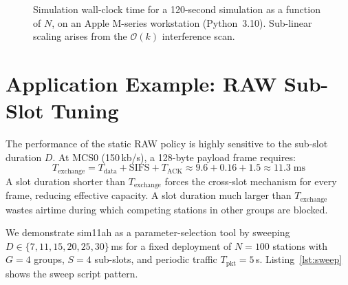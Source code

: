 \documentclass[conference]{IEEEtran}
\begin{document}
\begin{figure}[!t]
\centering
{}
\caption{Simulation wall-clock time for a 120-second simulation as a function
  of $N$, on an Apple M-series workstation (Python~3.10).
  Sub-linear scaling arises from the $\mathcal{O}(k)$ interference scan.}
\label{fig:speed}
\end{figure}

\section{Application Example: RAW Sub-Slot Tuning}
\label{sec:app_example}

The performance of the static RAW policy is highly sensitive to the
sub-slot duration $D$.
At MCS0 (150\,kb/s), a 128-byte payload frame requires:
\begin{equation}
  T_\mathrm{exchange} = T_\mathrm{data} + \mathrm{SIFS} + T_\mathrm{ACK}
  \approx 9.6 + 0.16 + 1.5 \approx 11.3\;\mathrm{ms}
\end{equation}
A slot duration shorter than $T_\mathrm{exchange}$ forces the cross-slot
mechanism for every frame, reducing effective capacity.
A slot duration much larger than $T_\mathrm{exchange}$ wastes airtime during
which competing stations in other groups are blocked.

We demonstrate sim11ah as a parameter-selection tool by sweeping
$D \in \{7, 11, 15, 20, 25, 30\}$\,ms for a fixed deployment of $N{=}100$
stations with $G{=}4$ groups, $S{=}4$ sub-slots, and periodic traffic
$T_\mathrm{pkt}{=}5$\,s.
Listing~\ref{lst:sweep} shows the sweep script pattern.
\end{document}
